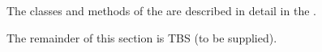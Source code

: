 The classes and methods of the \ModelDesc are described in detail in the
.

The remainder of this section is TBS (to be supplied).
